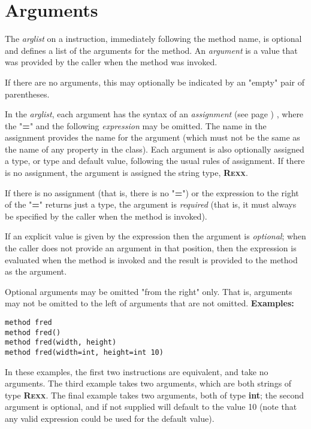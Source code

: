\section{Arguments}
 
The \emph{arglist} on a  instruction, immediately
following the method name, is optional and defines a list of the
arguments for the method.  An \emph{argument} is a value that was
provided by the caller when the method was invoked.
 
If there are no arguments, this may optionally be indicated by an
"empty" pair of parentheses.
 
In the \emph{arglist}, each argument has the syntax of an
 \emph{assignment} (see page \pageref{refassign}) , where the "\textbf{=}"
and the following \emph{expression} may be omitted.
The name in the assignment provides the name for the argument (which
must not be the same as the name of any property in the class).
Each argument is also optionally assigned a type, or type and default
value, following the usual rules of assignment.
If there is no assignment, the argument is assigned the \nr{} string
type, \textbf{R\textsc{exx}}.
 
If there is no assignment (that is, there is no "\textbf{=}") or
the expression to the right of the "\textbf{=}" returns just a
type, the argument is \emph{required} (that is, it must always be
specified by the caller when the method is invoked).
 
If an explicit value is given by the expression then the argument is
\emph{optional}; when the caller does not provide an argument in that
position, then the expression is evaluated when the method is invoked
and the result is provided to the method as the argument.
 
Optional arguments may be omitted "from the right" only.
That is, arguments may not be omitted to the left of arguments that are
not omitted.
 \textbf{Examples:}
\begin{lstlisting}
method fred
method fred()
method fred(width, height)
method fred(width=int, height=int 10)
\end{lstlisting}
In these examples, the first two  instructions are
equivalent, and take no arguments.
The third example takes two arguments, which are both strings
of type \textbf{R\textsc{exx}}.
The final example takes two arguments, both of type \textbf{int}; the
second argument is optional, and if not supplied will default to the
value 10 (note that any valid expression could be used for the default
value).
